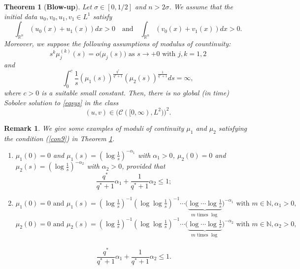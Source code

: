 \documentclass[11pt,reqno]{amsart}
\newcommand{\tron}[1]{\left( #1 \right)}
\numberwithin{equation}{section}
\newtheorem{theorem}{Theorem}[section]
\newtheorem{remark}{Remark}[section]
\theoremstyle{plain}
\begin{document}
\begin{theorem}[\textbf{Blow-up}] \label{thr3.1}
    Let $\sigma\in \left[0,1/2\right]$ and $n>2\sigma$. We assume that the initial data $u_0,v_0,u_1,v_1\in L^1 $ satisfy
    \begin{equation}\label{con7}
        \int_{\mathbb{R}^n}\left(u_0(x)+u_1(x)\right)dx>0\quad \text{and}\quad \int_{\mathbb{R}^n}\left(v_0(x)+v_1(x)\right)dx>0.
    \end{equation}
    Moreover, we suppose the following assumptions of modulus of countinuity:
    \begin{equation}\label{con8}
        s^{k}\mu^{(k)}_{j}(s)= o\big(\mu_j(s)\big)\text{ as }s\to +0\text{ with }j,k=1,2
    \end{equation}
    and
    \begin{equation}\label{con9}
    \int_{0}^c\frac{1}{s}\tron{\mu_1(s)}^{\frac{q^*}{q^*+1}}\tron{\mu_2(s)}^{\frac{1}{q^*+1}}ds=\infty,
    \end{equation}
    where $c>0$ is a suitable small constant. Then, there is no global (in time) Sobolev solution to \eqref{eqsys} in the class
    $$ (u,v) \in \big(\mathcal{C}([0,\infty),L^2)\big)^2. $$
\end{theorem}
\begin{remark}
{\rm
    We give some examples of moduli of continuity $\mu_1$ and $\mu_2$ satisfying the condition (\ref{con9}) in Theorem \ref{thr3.1}. 
    \begin{enumerate}[1.]
    \item $\mu_1(0)=0$ and $\mu_1(s)=\left(\log \frac{1}{s}\right)^{-\alpha_1}$ with $\alpha_1>0$, $\mu_2(0)=0$ and $\mu_2(s)=\left(\log \frac{1}{s}\right)^{-\alpha_2}$ with $\alpha_2>0$, provided that
    $$
    \frac{q^*}{q^*+1} \alpha_1+\frac{1}{q^*+1} \alpha_2 \leq 1 ;
    $$
    \item $\mu_1(0)=0 \text { and } \mu_1(s)=\left(\log \frac{1}{s}\right)^{-1}\left(\log \log \frac{1}{s}\right)^{-1} \cdots\Bigg(\underbrace{\log \cdots \log \frac{1}{s}}_{m \text { times } \log }\Bigg)^{-\alpha_1}\text { with } m \in \mathbb{N}, \alpha_1>0,$ \\
    $\mu_2(0)=0 \text { and } \mu_2(s)=\left(\log \frac{1}{s}\right)^{-1}\left(\log \log \frac{1}{s}\right)^{-1} \cdots\Bigg(\underbrace{\log \cdots \log \frac{1}{s}}_{m \text { times } \log }\Bigg)^{-\alpha_2} \text { with } m \in \mathbb{N}, \alpha_2>0,$ \\
     \\
    \[
    \frac{q^*}{q^*+1} \alpha_1+\frac{1}{q^*+1} \alpha_2 \leq 1 .
    \]
    \end{enumerate}    
}
\end{remark}
\end{document}
